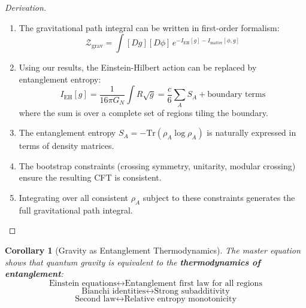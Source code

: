\documentclass[12pt,a4paper]{article}
\newtheorem{corollary}[theorem]{Corollary}
\begin{document}
\begin{proof}[Derivation]
\begin{enumerate}
    \item The gravitational path integral can be written in first-order formalism:
    \begin{equation}
    \mathcal{Z}_{\text{grav}} = \int [Dg][D\phi] \, e^{-I_{\text{EH}}[g] - I_{\text{matter}}[\phi, g]}
    \end{equation}
    
    \item Using our results, the Einstein-Hilbert action can be replaced by entanglement entropy:
    \begin{equation}
    I_{\text{EH}}[g] = \frac{1}{16\pi G_N}\int R \sqrt{g} = \frac{c}{6} \sum_A S_A + \text{boundary terms}
    \end{equation}
    where the sum is over a complete set of regions tiling the boundary.
    
    \item The entanglement entropy $S_A = -\text{Tr}(\rho_A \log \rho_A)$ is naturally expressed in terms of density matrices.
    
    \item The bootstrap constraints (crossing symmetry, unitarity, modular crossing) ensure the resulting CFT is consistent.
    
    \item Integrating over all consistent $\rho_A$ subject to these constraints generates the full gravitational path integral.
\end{enumerate}
\end{proof}

\begin{corollary}[Gravity as Entanglement Thermodynamics]
The master equation shows that quantum gravity is equivalent to the \textbf{thermodynamics of entanglement}:
\begin{equation}
\text{Einstein equations} \leftrightarrow \text{Entanglement first law for all regions}
\end{equation}
\begin{equation}
\text{Bianchi identities} \leftrightarrow \text{Strong subadditivity}
\end{equation}
\begin{equation}
\text{Second law} \leftrightarrow \text{Relative entropy monotonicity}
\end{equation}
\end{corollary}
\end{document}
